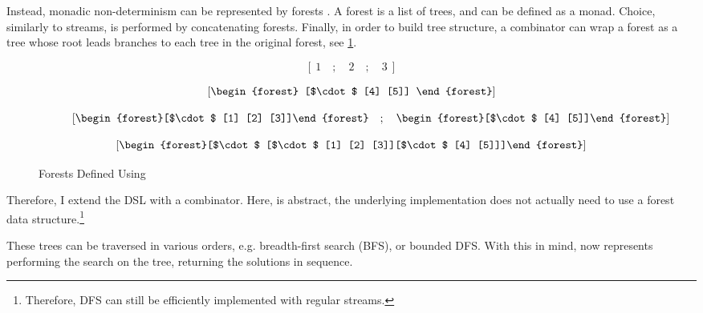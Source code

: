 Instead, monadic non-determinism can be represented by forests \cite{Bunches}. A forest is a list of trees, and can be defined as a monad. Choice, similarly to streams, is performed by concatenating forests. Finally, in order to build tree structure, a  combinator can wrap a forest as a tree whose root leads branches to each tree in the original forest, see \cref{fig:Wrap}.

\begin{figure}[h]
\centering
\begin{subfigure}{0.45\textwidth}
\centering
\[\left[\ 1\quad ; \quad 2 \quad ; \quad 3\ \right]\]
\caption{  }
\end{subfigure}
\begin{subfigure}{0.45\textwidth}
\centering
\[\left[\vcenter{\hbox{\begin{forest}
[$\cdot$ [4] [5]]
\end{forest}}}\right]\]
\caption{}
\end{subfigure}
\begin{subfigure}{0.45\textwidth}
\centering
\[\left[\vcenter{\hbox{\begin{forest}[$\cdot$ [1] [2] [3]]\end{forest}}} \quad ; \quad\vcenter{\hbox{\begin{forest}[$\cdot$ [4] [5]]\end{forest}}}\right]\]
\caption{}
\end{subfigure}
\begin{subfigure}{0.45\textwidth}
\centering
\[\left[\vcenter{\hbox{\begin{forest}[$\cdot$ [$\cdot$ [1] [2] [3]][$\cdot$ [4] [5]]]\end{forest}}}\right]\]
\caption{}
\end{subfigure}
\caption{Forests Defined Using }
\label{fig:Wrap}
\end{figure}

Therefore, I extend the DSL with a  combinator. Here,  is abstract, the underlying implementation does not actually need to use a forest data structure.\footnote{Therefore, DFS can still be efficiently implemented with regular streams.}

These trees can be traversed in various orders, e.g. breadth-first search (BFS)\cite{BFSCombinators}, or bounded DFS. With this in mind,  now represents performing the search on the tree, returning the solutions in sequence.

